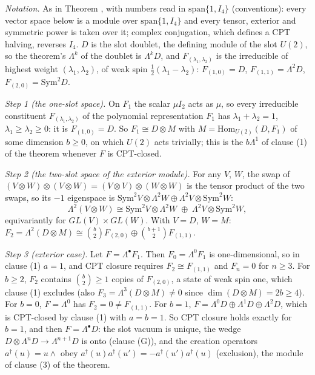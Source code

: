 \emph{Notation.} As in Theorem , with numbers read in $\mathrm{span}\{1, I_{4}\}$ (conventions): every vector space below is a module over $\mathrm{span}\{1, I_{4}\}$ and every tensor, exterior and symmetric power is taken over it; complex conjugation, which defines a CPT halving, reverses $I_{4}$. $D$ is the slot doublet, the defining module of the slot $U(2)$, so the theorem's $\Lambda^{k}$ of the doublet is $\Lambda^{k}D$, and $F_{(\lambda_{1}, \lambda_{2})}$ is the irreducible of highest weight $(\lambda_{1}, \lambda_{2})$, of weak spin $\tfrac12(\lambda_{1} - \lambda_{2})$: $F_{(1,0)} = D$, $F_{(1,1)} = \Lambda^{2}D$, $F_{(2,0)} = \mathrm{Sym}^{2}D$.

\emph{Step 1 (the one-slot space).} On $F_{1}$ the scalar $\mu I_{2}$ acts as $\mu$, so every irreducible constituent $F_{(\lambda_{1}, \lambda_{2})}$ of the polynomial representation $F_{1}$ has $\lambda_{1} + \lambda_{2} = 1$, $\lambda_{1} \ge \lambda_{2} \ge 0$: it is $F_{(1,0)} = D$. So $F_{1} \cong D \otimes M$ with $M = \mathrm{Hom}_{U(2)}(D, F_{1})$ of some dimension $b \ge 0$, on which $U(2)$ acts trivially; this is the $b\Lambda^{1}$ of clause (1) of the theorem whenever $F$ is CPT-closed.

\emph{Step 2 (the two-slot space of the exterior module).} For any $V$, $W$, the swap of $(V \otimes W) \otimes (V \otimes W) = (V \otimes V) \otimes (W \otimes W)$ is the tensor product of the two swaps, so its $-1$ eigenspace is $\mathrm{Sym}^{2}V \otimes \Lambda^{2}W \oplus \Lambda^{2}V \otimes \mathrm{Sym}^{2}W$:
\[ \Lambda^{2}(V \otimes W) \cong \mathrm{Sym}^{2}V \otimes \Lambda^{2}W \;\oplus\; \Lambda^{2}V \otimes \mathrm{Sym}^{2}W , \]
equivariantly for $GL(V) \times GL(W)$. With $V = D$, $W = M$: $F_{2} = \Lambda^{2}(D \otimes M) \cong \binom{b}{2}F_{(2,0)} \oplus \binom{b+1}{2}F_{(1,1)}$.

\emph{Step 3 (exterior case).} Let $F = \Lambda^{\bullet}F_{1}$. Then $F_{0} = \Lambda^{0}F_{1}$ is one-dimensional, so in clause (1) $a = 1$, and CPT closure requires $F_{2} \cong F_{(1,1)}$ and $F_{n} = 0$ for $n \ge 3$. For $b \ge 2$, $F_{2}$ contains $\binom{b}{2} \ge 1$ copies of $F_{(2,0)}$, a state of weak spin one, which clause (1) excludes (also $F_{3} = \Lambda^{3}(D \otimes M) \ne 0$ since $\dim(D \otimes M) = 2b \ge 4$). For $b = 0$, $F = \Lambda^{0}$ has $F_{2} = 0 \ne F_{(1,1)}$. For $b = 1$, $F = \Lambda^{0}D \oplus \Lambda^{1}D \oplus \Lambda^{2}D$, which is CPT-closed by clause (1) with $a = b = 1$. So CPT closure holds exactly for $b = 1$, and then $F = \Lambda^{\bullet}D$: the slot vacuum is unique, the wedge $D \otimes \Lambda^{n}D \to \Lambda^{n+1}D$ is onto (clause (G)), and the creation operators $a^{\dagger}(u) = u \wedge$ obey $a^{\dagger}(u)a^{\dagger}(u') = -a^{\dagger}(u')a^{\dagger}(u)$ (exclusion), the module of clause (3) of the theorem.

